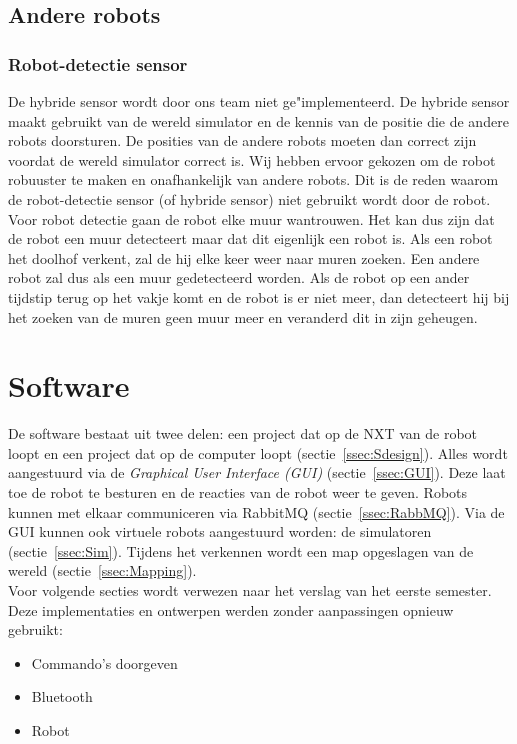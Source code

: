 \documentclass[tt3]{penoverslag}
\begin{document}
\subsection{Andere robots}
\subsubsection{Robot-detectie sensor}
\label{ssec:AlgoCollision}

De hybride sensor wordt door ons team niet ge"implementeerd. De hybride sensor maakt gebruikt van de wereld simulator en de kennis van de positie die de andere robots doorsturen. De posities van de andere robots moeten dan correct zijn voordat de wereld simulator correct is. Wij hebben ervoor gekozen om de robot robuuster te maken en onafhankelijk van andere robots. Dit is de reden waarom de robot-detectie sensor (of hybride sensor) niet gebruikt wordt door de robot. Voor robot detectie gaan de robot elke muur wantrouwen. Het kan dus zijn dat de robot een muur detecteert maar dat dit eigenlijk een robot is. Als een robot het doolhof verkent, zal de hij elke keer weer naar muren zoeken. Een andere robot zal dus als een muur gedetecteerd worden. Als de robot op een ander tijdstip terug op het vakje komt en de robot is er niet meer, dan detecteert hij bij het zoeken van de muren geen muur meer en veranderd dit in zijn geheugen. 


\section{Software}
\label{sec:Softw}
De software bestaat uit twee delen: een project dat op de NXT van de robot loopt en een project dat op de computer loopt (sectie~\ref{ssec:Sdesign}). Alles wordt aangestuurd via de \textit{Graphical User Interface (GUI)} (sectie~\ref{ssec:GUI}). Deze laat toe de robot te besturen en de reacties van de robot weer te geven. Robots kunnen met elkaar communiceren via RabbitMQ (sectie~\ref{ssec:RabbMQ}). Via de GUI kunnen ook virtuele robots aangestuurd worden: de simulatoren (sectie~\ref{ssec:Sim}). Tijdens het verkennen wordt een map opgeslagen van de wereld (sectie~\ref{ssec:Mapping}).\\

Voor volgende secties wordt verwezen naar het verslag van het eerste semester. Deze implementaties en ontwerpen werden zonder aanpassingen opnieuw gebruikt:

\begin{itemize}
\item Commando's doorgeven
\item Bluetooth
\item Robot
\end{itemize}
\end{document}
